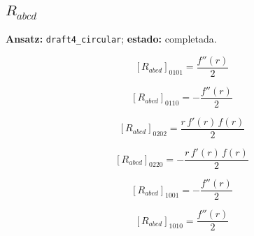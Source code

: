 \documentclass[11pt]{article}
\begin{document}
\subsection*{$ R_{abcd} $}
\textbf{Ansatz:} \texttt{draft4\_circular}; \textbf{estado:} completada.\par
\begin{dmath*}[breakdepth={5}]
\left[R_{abcd}\right]_{0101} = \frac{f''\!\left(r\right)}{2}
\end{dmath*}
\par\smallskip
\begin{dmath*}[breakdepth={5}]
\left[R_{abcd}\right]_{0110} = -\frac{f''\!\left(r\right)}{2}
\end{dmath*}
\par\smallskip
\begin{dmath*}[breakdepth={5}]
\left[R_{abcd}\right]_{0202} = \frac{r\,f'\!\left(r\right)\,f\!\left(r\right)}{2}
\end{dmath*}
\par\smallskip
\begin{dmath*}[breakdepth={5}]
\left[R_{abcd}\right]_{0220} = -\frac{r\,f'\!\left(r\right)\,f\!\left(r\right)}{2}
\end{dmath*}
\par\smallskip
\begin{dmath*}[breakdepth={5}]
\left[R_{abcd}\right]_{1001} = -\frac{f''\!\left(r\right)}{2}
\end{dmath*}
\par\smallskip
\begin{dmath*}[breakdepth={5}]
\left[R_{abcd}\right]_{1010} = \frac{f''\!\left(r\right)}{2}
\end{dmath*}
\par\smallskip
\end{document}
